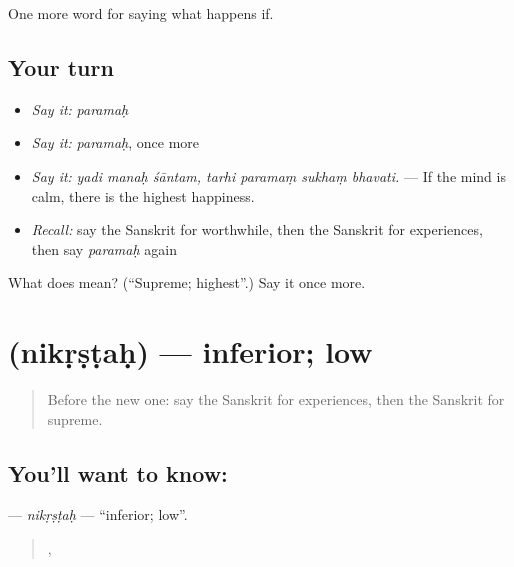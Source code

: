 \begin{grammarlens}[title={What you've built}]
One more word for saying what happens if.
\end{grammarlens}

\subsection*{Your turn}
\begin{itemize}
\raggedright
  \item \emph{Say it:} \emph{paramaḥ}
  \item \emph{Say it:} \emph{paramaḥ}, once more
  \item \emph{Say it:} \emph{yadi manaḥ śāntam, tarhi paramaṃ sukhaṃ bhavati.} — If the mind is calm, there is the highest happiness.
  \item \emph{Recall:} say the Sanskrit for worthwhile, then the Sanskrit for experiences, then say \emph{paramaḥ} again
\end{itemize}

\begin{tcolorbox}[breakable,colback=teal!4,colframe=teal!35!black,title={Before you move on}]
What does  mean? (\textquotedblleft{}Supreme; highest\textquotedblright{}.) Say it once more.
\end{tcolorbox}
\section[\texorpdfstring{\sk{निकृष्टः} (nikṛṣṭaḥ)}{निकृष्टः (nikṛṣṭaḥ)}]{ (nikṛṣṭaḥ) — inferior; low}

\label{lesson:SA-C391-nikrstah}



\begin{quote}
Before the new one: say the Sanskrit for experiences, then the Sanskrit for supreme.
\end{quote}

\subsection*{You'll want to know: }
\textbf{} — \emph{nikṛṣṭaḥ} — \textquotedblleft{}inferior; low\textquotedblright{}.

\begin{quote}
  ,    
\end{quote}

